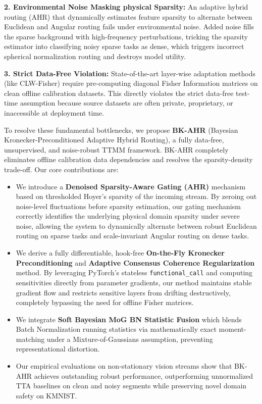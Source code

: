 \documentclass{article}
\theoremstyle{plain}
\theoremstyle{definition}
\theoremstyle{remark}
\begin{document}
\textbf{2. Environmental Noise Masking physical Sparsity:} An adaptive hybrid routing (AHR) that dynamically estimates feature sparsity to alternate between Euclidean and Angular routing fails under environmental noise. Added noise fills the sparse background with high-frequency perturbations, tricking the sparsity estimator into classifying noisy sparse tasks as dense, which triggers incorrect spherical normalization routing and destroys model utility.

\textbf{3. Strict Data-Free Violation:} State-of-the-art layer-wise adaptation methods (like CLW-Fisher) require pre-computing diagonal Fisher Information matrices on clean offline calibration datasets. This directly violates the strict data-free test-time assumption because source datasets are often private, proprietary, or inaccessible at deployment time.

To resolve these fundamental bottlenecks, we propose \textbf{BK-AHR} (Bayesian Kronecker-Preconditioned Adaptive Hybrid Routing), a fully data-free, unsupervised, and noise-robust TTMM framework. BK-AHR completely eliminates offline calibration data dependencies and resolves the sparsity-density trade-off. Our core contributions are:
\begin{itemize}
  \item We introduce a \textbf{Denoised Sparsity-Aware Gating (AHR)} mechanism based on thresholded Hoyer's sparsity of the incoming stream. By zeroing out noise-level fluctuations before sparsity estimation, our gating mechanism correctly identifies the underlying physical domain sparsity under severe noise, allowing the system to dynamically alternate between robust Euclidean routing on sparse tasks and scale-invariant Angular routing on dense tasks.
  \item We derive a fully differentiable, hook-free \textbf{On-the-Fly Kronecker Preconditioning} and \textbf{Adaptive Consensus Coherence Regularization} method. By leveraging PyTorch's stateless \texttt{functional\_call} and computing sensitivities directly from parameter gradients, our method maintains stable gradient flow and restricts sensitive layers from drifting destructively, completely bypassing the need for offline Fisher matrices.
  \item We integrate \textbf{Soft Bayesian MoG BN Statistic Fusion} which blends Batch Normalization running statistics via mathematically exact moment-matching under a Mixture-of-Gaussians assumption, preventing representational distortion.
  \item Our empirical evaluations on non-stationary vision streams show that BK-AHR achieves outstanding robust performance, outperforming unnormalized TTA baselines on clean and noisy segments while preserving novel domain safety on KMNIST.
\end{itemize}
\end{document}
